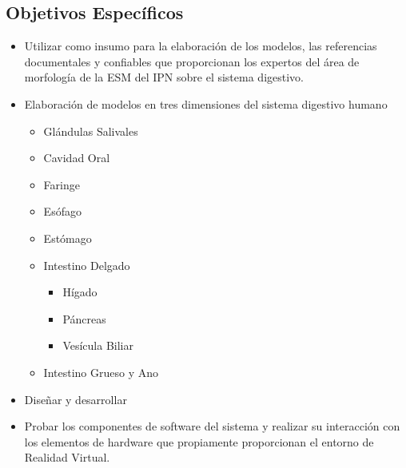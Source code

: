 \subsection{Objetivos Específicos}
\begin{itemize}
	\item Utilizar como insumo para la elaboración de los modelos, las referencias documentales y confiables que proporcionan los expertos del área de morfología de la ESM del IPN sobre el sistema digestivo.
	\item Elaboración de modelos en tres dimensiones del sistema digestivo humano
	\begin{itemize}
		\item Glándulas Salivales
		\item Cavidad Oral
		\item Faringe
		\item Esófago
		\item Estómago
		\item Intestino Delgado
		\begin{itemize}
		  \item Hígado
		  \item Páncreas
		  \item Vesícula Biliar
		\end{itemize}
		\item Intestino Grueso y Ano  
	  \end{itemize}
	\item Diseñar y desarrollar
	\item Probar los componentes de software del sistema y realizar su interacción con los elementos de hardware que propiamente proporcionan el entorno de  Realidad Virtual.	
\end{itemize}


